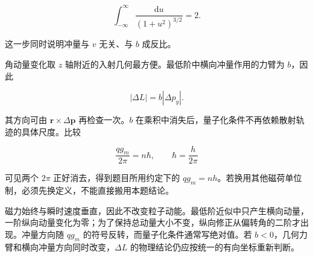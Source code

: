 \documentclass[12pt,a4paper,UTF8]{ctexart}
\begin{document}
\[\int_{-\infty}^{\infty}\frac{\mathrm du}{(1+u^2)^{3/2}}=2.\]

这一步同时说明冲量与 \(v\) 无关、与 \(b\) 成反比。

角动量变化取 \(z\) 轴附近的入射几何最方便。最低阶中横向冲量作用的力臂为
\(b\)，因此

\[|\Delta L|=b|\Delta p_y|.\]

其方向可由 \(\boldsymbol r\times\Delta\boldsymbol p\) 再检查一次。\(b\)
在乘积中消失后，量子化条件不再依赖散射轨迹的具体尺度。比较

\[\frac{qg_m}{2\pi}=n\hbar,\qquad \hbar=\frac{h}{2\pi}\]

可见两个 \(2\pi\) 正好消去，得到题目所用约定下的
\(qg_m=nh\)。若换用其他磁荷单位制，必须先换定义，不能直接搬用本题结论。

磁力始终与瞬时速度垂直，因此不改变粒子动能。最低阶近似中只产生横向动量，一阶纵向动量变化为零；为了保持总动量大小不变，纵向修正从偏转角的二阶才出现。冲量方向随
\(qg_m\) 的符号反转，而量子化条件通常写绝对值。若
\(b<0\)，几何力臂和横向冲量方向同时改变，\(\Delta L\)
的物理结论仍应按统一的有向坐标重新判断。
\end{document}
